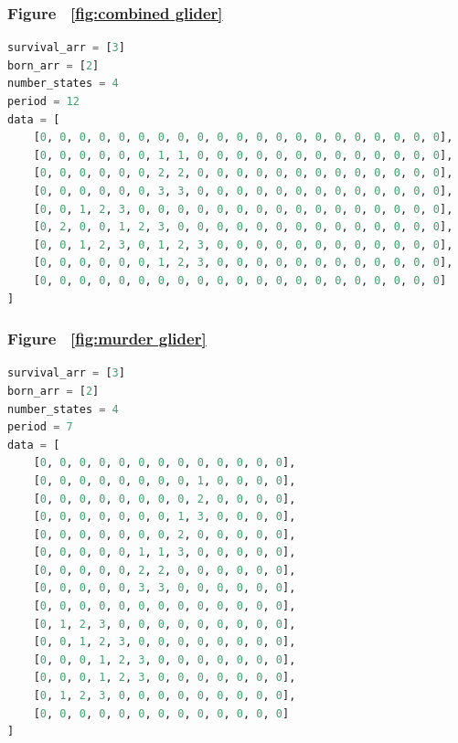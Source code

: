 \documentclass[12pt]{article}
\numberwithin{figure}{section} %
\begin{document}
\subsubsection{Figure ~\ref{fig:combined glider}}
\label{subsubsection:combined glider}
\begin{lstlisting}[language = Python]
survival_arr = [3]
born_arr = [2]
number_states = 4
period = 12
data = [
    [0, 0, 0, 0, 0, 0, 0, 0, 0, 0, 0, 0, 0, 0, 0, 0, 0, 0, 0, 0, 0],
    [0, 0, 0, 0, 0, 0, 1, 1, 0, 0, 0, 0, 0, 0, 0, 0, 0, 0, 0, 0, 0],
    [0, 0, 0, 0, 0, 0, 2, 2, 0, 0, 0, 0, 0, 0, 0, 0, 0, 0, 0, 0, 0],
    [0, 0, 0, 0, 0, 0, 3, 3, 0, 0, 0, 0, 0, 0, 0, 0, 0, 0, 0, 0, 0],
    [0, 0, 1, 2, 3, 0, 0, 0, 0, 0, 0, 0, 0, 0, 0, 0, 0, 0, 0, 0, 0],
    [0, 2, 0, 0, 1, 2, 3, 0, 0, 0, 0, 0, 0, 0, 0, 0, 0, 0, 0, 0, 0],
    [0, 0, 1, 2, 3, 0, 1, 2, 3, 0, 0, 0, 0, 0, 0, 0, 0, 0, 0, 0, 0],
    [0, 0, 0, 0, 0, 0, 1, 2, 3, 0, 0, 0, 0, 0, 0, 0, 0, 0, 0, 0, 0],
    [0, 0, 0, 0, 0, 0, 0, 0, 0, 0, 0, 0, 0, 0, 0, 0, 0, 0, 0, 0, 0]
]
\end{lstlisting}

\subsubsection{Figure ~\ref{fig:murder glider}}
\label{subsubsection:murder glider}
\begin{lstlisting}[language = Python]
survival_arr = [3]
born_arr = [2]
number_states = 4
period = 7
data = [
    [0, 0, 0, 0, 0, 0, 0, 0, 0, 0, 0, 0, 0],
    [0, 0, 0, 0, 0, 0, 0, 0, 1, 0, 0, 0, 0],
    [0, 0, 0, 0, 0, 0, 0, 0, 2, 0, 0, 0, 0],
    [0, 0, 0, 0, 0, 0, 0, 1, 3, 0, 0, 0, 0],
    [0, 0, 0, 0, 0, 0, 0, 2, 0, 0, 0, 0, 0],
    [0, 0, 0, 0, 0, 1, 1, 3, 0, 0, 0, 0, 0],
    [0, 0, 0, 0, 0, 2, 2, 0, 0, 0, 0, 0, 0],
    [0, 0, 0, 0, 0, 3, 3, 0, 0, 0, 0, 0, 0],
    [0, 0, 0, 0, 0, 0, 0, 0, 0, 0, 0, 0, 0],
    [0, 1, 2, 3, 0, 0, 0, 0, 0, 0, 0, 0, 0],
    [0, 0, 1, 2, 3, 0, 0, 0, 0, 0, 0, 0, 0],
    [0, 0, 0, 1, 2, 3, 0, 0, 0, 0, 0, 0, 0],
    [0, 0, 0, 1, 2, 3, 0, 0, 0, 0, 0, 0, 0],
    [0, 1, 2, 3, 0, 0, 0, 0, 0, 0, 0, 0, 0],
    [0, 0, 0, 0, 0, 0, 0, 0, 0, 0, 0, 0, 0]
]

\end{lstlisting}

\newpage
\end{document}
